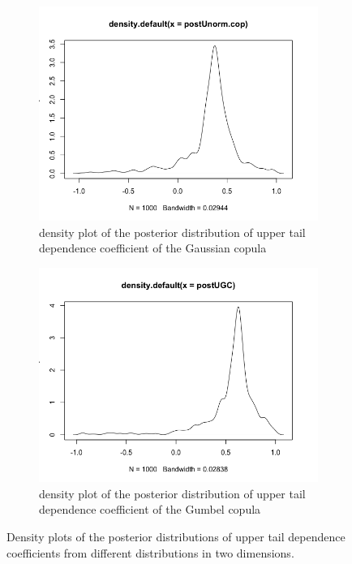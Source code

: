 \documentclass[mstat,12pt]{unswthesis}  %
\numberwithin{equation}{section}
\begin{document}
\begin{figure}[h]
\begin{subfigure}{.42\textwidth}
  \centering
  \includegraphics[width=\linewidth]{postUGau.png}  
  \caption{density plot of the posterior distribution of upper tail dependence coefficient of the Gaussian copula}
  \label{fig:sub-third}
\end{subfigure}
\begin{subfigure}{.42\textwidth}
  \centering
  \includegraphics[width=\linewidth]{postUGC.png}  
  \caption{density plot of the posterior distribution of upper tail dependence coefficient of the Gumbel copula}
  \label{fig:sub-fourth}
\end{subfigure}
\caption{Density plots of the posterior distributions of upper tail dependence coefficients from different distributions in two dimensions.}
\label{fig:fig}
\end{figure}
\end{document}
